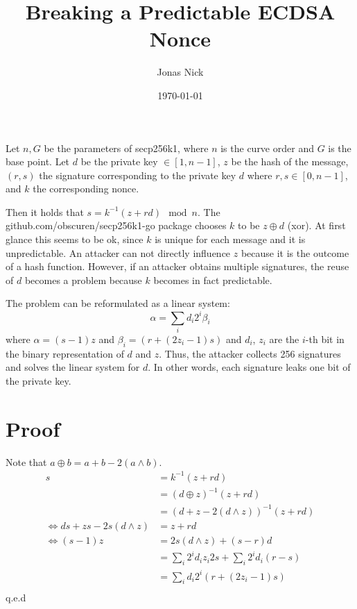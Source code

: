 \documentclass[11pt,a4paper,oneside]{article}
\title{Breaking a Predictable ECDSA Nonce}
\date{\today}
\author{Jonas Nick}
\begin{document}
\maketitle 
Let $n, G$ be the parameters of secp256k1, where $n$ is the curve order and $G$ is the base point.
Let $d$ be the private key $\in [1, n-1]$, $z$ be the hash of the message, $(r,s)$ the signature corresponding
to the private key $d$ where $r,s \in [0, n-1]$, and $k$ the corresponding nonce.

Then it holds that $s=k^{-1}(z+rd)\mod n$. The github.com/obscuren/secp256k1-go package chooses $k$ to be
$z\oplus d$ (xor). 
At first glance this seems to be ok, since $k$ is unique for each message and
it is unpredictable. An attacker can not directly influence $z$ because it is the outcome of a hash function.
However, if an attacker obtains multiple signatures, the reuse of $d$ becomes a problem because $k$ 
becomes in fact predictable. 

The problem can be reformulated as a linear system:
\begin{equation}
    \alpha = \sum_i d_i 2^i \beta_i
\end{equation}
where $\alpha = (s-1)z$ and $\beta_i = (r + (2z_i - 1)s)$ and $d_i$, $z_i$ are the $i$-th bit in the binary representation of $d$ and $z$.
Thus, the attacker collects 256 signatures and solves the linear system for $d$. 
In other words, each signature leaks one bit of the private key.

\section{Proof}

Note that $a \oplus b = a + b - 2(a\wedge b)$.
\begin{align*}
s&=k^{-1}(z+rd) \\
    &= (d\oplus z)^{-1}(z+rd)\\
    &= (d + z - 2(d\wedge z))^{-1}(z+rd)\\
    \iff ds + zs - 2s(d\wedge z)&= z + rd\\
    \iff (s-1)z &= 2s(d\wedge z)+(s-r)d\\
                &= \sum_i 2^i d_i z_i 2s + \sum_i 2^i d_i (r-s) \\
                &= \sum_i d_i 2^i (r + (2z_i - 1)s) \\
\end{align*}
q.e.d
\end{document}
